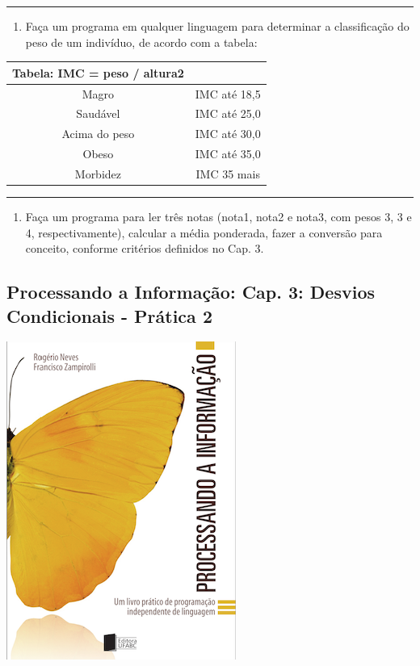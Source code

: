 \documentclass[12pt,a4paper]{article}
\renewcommand{\linethickness}{0.05em}
\providecommand{\tightlist}{%
      \setlength{\itemsep}{0pt}\setlength{\parskip}{0pt}}
\begin{document}
    \begin{center}\rule{0.5\linewidth}{\linethickness}\end{center}

\begin{enumerate}
\def\labelenumi{\arabic{enumi}.}
\setcounter{enumi}{3}
\tightlist
\item
  Faça um programa em qualquer linguagem para determinar a classificação
  do peso de um indivíduo, de acordo com a tabela:
\end{enumerate}

    \begin{longtable}[]{@{}cc@{}}
\toprule
Tabela: IMC = peso / altura2 &\tabularnewline
\midrule
\endhead
Magro & IMC até 18,5\tabularnewline
Saudável & IMC até 25,0\tabularnewline
Acima do peso & IMC até 30,0\tabularnewline
Obeso & IMC até 35,0\tabularnewline
Morbidez & IMC 35 mais\tabularnewline
\bottomrule
\end{longtable}

    \begin{center}\rule{0.5\linewidth}{\linethickness}\end{center}

\begin{enumerate}
\def\labelenumi{\arabic{enumi}.}
\setcounter{enumi}{4}
\tightlist
\item
  Faça um programa para ler três notas (nota1, nota2 e nota3, com pesos
  3, 3 e 4, respectivamente), calcular a média ponderada, fazer a
  conversão para conceito, conforme critérios definidos no Cap. 3.
\end{enumerate}

    \hypertarget{processando-a-informauxe7uxe3o-cap.-3-desvios-condicionais---pruxe1tica-2}{%
\subsection{Processando a Informação: Cap. 3: Desvios Condicionais -
Prática
2}\label{processando-a-informauxe7uxe3o-cap.-3-desvios-condicionais---pruxe1tica-2}}

    \includegraphics{"figs/Capa_Processando_Informacao.jpg"}
\end{document}
